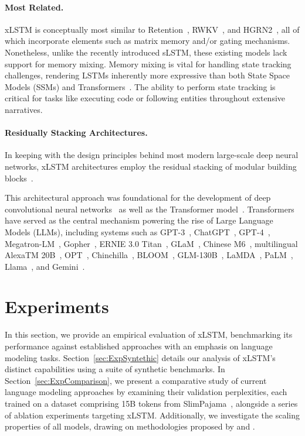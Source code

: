 \paragraph{Most Related.} xLSTM is conceptually most similar to Retention~\citep{Sun:23arxiv}, RWKV~\citep{Peng:23arxivshort,Peng:24arxivshort}, and HGRN2~\citep{Qin:24arxiv}, all of which incorporate elements such as matrix memory and/or gating mechanisms. Nonetheless, unlike the recently introduced sLSTM, these existing models lack support for memory mixing. Memory mixing is vital for handling state tracking challenges, rendering LSTMs inherently more expressive than both State Space Models (SSMs) and Transformers~\citep{Merrill:24,Deletang:23}. The ability to perform state tracking is critical for tasks like executing code or following entities throughout extensive narratives.

\paragraph{Residually Stacking Architectures.} In keeping with the design principles behind most modern large-scale deep neural networks, xLSTM architectures employ the residual stacking of modular building blocks~\citep{Srivastava:15,He:16}.

This architectural approach was foundational for the development of deep convolutional neural networks~\citep{He:16} as well as the Transformer model~\citep{Vaswani:17}. Transformers have served as the central mechanism powering the rise of Large Language Models (LLMs), including systems such as GPT-3~\citep{Brown:20short}, ChatGPT~\citep{Schulman:22short}, GPT-4~\citep{Achiam:23gpt4short}, Megatron-LM~\citep{Shoeybi:19}, Gopher~\citep{Rae:21short}, ERNIE 3.0 Titan~\citep{Wang:21arxivshort}, GLaM~\citep{Du:21glamshort}, Chinese M6~\citep{Lin:21}, multilingual AlexaTM 20B~\citep{Soltan:22}, OPT~\citep{Zhang:22opt}, Chinchilla~\citep{Hoffmann:22short}, BLOOM~\citep{Scao:22arxivshort}, GLM-130B~\citep{Zeng:22arxivshort}, LaMDA~\citep{Thoppilan:22short}, PaLM~\citep{Chowdhery:22short}, Llama~\citep{Touvron:23arxiv}, and Gemini~\citep{GeminiTeam:23arxiv,Reid:24arxiv}.

\section{Experiments}
\label{sec:Exp}

In this section, we provide an empirical evaluation of xLSTM, benchmarking its performance against established approaches with an emphasis on language modeling tasks. Section~\ref{sec:ExpSyntethic} details our analysis of xLSTM's distinct capabilities using a suite of synthetic benchmarks. In Section~\ref{sec:ExpComparison}, we present a comparative study of current language modeling approaches by examining their validation perplexities, each trained on a dataset comprising 15B tokens from SlimPajama~\citep{Soboleva:23}, alongside a series of ablation experiments targeting xLSTM. Additionally, we investigate the scaling properties of all models, drawing on methodologies proposed by \citet{Kaplan:20} and \citet{Brown:20short}.

